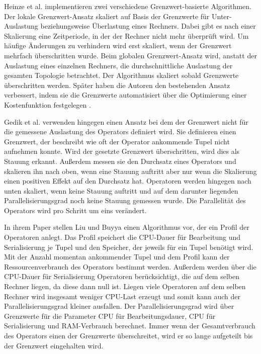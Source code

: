 Heinze et al. \cite{heinze_auto-scaling_2014} implementieren zwei verschiedene Grenzwert-basierte Algorithmen.
Der lokale Grenzwert-Ansatz skaliert auf Basis der Grenzwerte für Unter-Auslastung beziehungsweise Überlastung eines Rechners. 
Dabei gibt es nach einer Skalierung eine Zeitperiode, in der der Rechner nicht mehr überprüft wird.
Um häufige Änderungen zu verhindern wird erst skaliert, wenn der Grenzwert mehrfach überschritten wurde.
Beim globalen Grenzwert-Ansatz wird, anstatt der Auslastung eines einzelnen Rechners, die durchschnittliche Auslastung der gesamten Topologie betrachtet.
Der Algorithmus skaliert sobald Grenzwerte überschritten werden. 
Später haben die Autoren den bestehenden Ansatz verbessert, indem sie die Grenzwerte automatisiert über die Optimierung einer Kostenfunktion festgelegen \cite{heinze_online_2015}.

Gedik et al. \cite{gedik_elastic_2014} verwenden hingegen einen Ansatz bei dem der Grenzwert nicht für die gemessene Auslastung des Operators definiert wird.
Sie definieren einen Grenzwert, der beschreibt wie oft der Operator ankommende Tupel nicht aufnehmen konnte.
Wird der gesetzte Grenzwert überschritten, wird dies als Stauung erkannt.
Außerdem messen sie den Durchsatz eines Operators und skalieren ihn nach oben, wenn eine Stauung auftritt aber nur wenn die Skalierung einen positiven Effekt auf den Durchsatz hat.
Operatoren werden hingegen nach unten skaliert, wenn keine Stauung auftritt und auf dem darunter liegenden Parallelisierungsgrad noch keine Stauung gemessen wurde.
Die Parallelität des Operators wird pro Schritt um eins verändert.

In ihrem Paper stellen Liu und Buyya \cite{liu_performance-oriented_2017} einen Algorithmus vor, der ein Profil der Operatoren anlegt. 
Das Profil speichert die CPU-Dauer für Bearbeitung und Serialisierung je Tupel und den Speicher, der jeweils für ein Tupel benötigt wird.
Mit der Anzahl momentan ankommender Tupel und dem Profil kann der Ressourcenverbrauch des Operators bestimmt werden.
Außerdem werden über die CPU-Dauer für Serialisierung Operatoren berücksichtigt, die auf dem selben Rechner liegen, da diese dann null ist.
Liegen viele Operatoren auf dem selben Rechner wird insgesamt weniger CPU-Last erzeugt und somit kann auch der Parallelisierungsgrad kleiner ausfallen.
Der Parallelisierungsgrad wird über Grenzwerte für die Parameter CPU für Bearbeitungsdauer, CPU für Serialisierung und RAM-Verbrauch berechnet.
Immer wenn der Gesamtverbrauch des Operators einen der Grenzwerte überschreitet, wird er so lange aufgeteilt bis der Grenzwert eingehalten wird.

